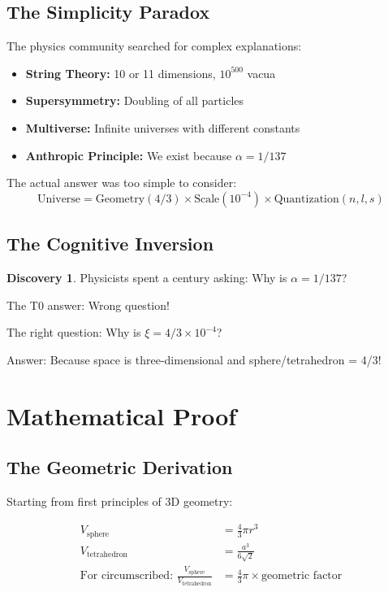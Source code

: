 \documentclass[12pt,a4paper]{article}
\theoremstyle{definition}
\newtheorem{discovery}{Discovery}[section]
\begin{document}
	\subsection{The Simplicity Paradox}
	
	The physics community searched for complex explanations:
	
	\begin{itemize}
		\item \textbf{String Theory:} 10 or 11 dimensions, $10^{500}$ vacua
		\item \textbf{Supersymmetry:} Doubling of all particles
		\item \textbf{Multiverse:} Infinite universes with different constants
		\item \textbf{Anthropic Principle:} We exist because $\alpha = 1/137$
	\end{itemize}
	
	The actual answer was too simple to consider:
	\begin{equation}
		\boxed{\text{Universe} = \text{Geometry}(4/3) \times \text{Scale}(10^{-4}) \times \text{Quantization}(n,l,s)}
	\end{equation}
	
	\subsection{The Cognitive Inversion}
	
	\begin{discovery}
		Physicists spent a century asking: Why is $\alpha = 1/137$?
		
		The T0 answer: Wrong question!
		
		The right question: Why is $\xi = 4/3 \times 10^{-4}$?
		
		Answer: Because space is three-dimensional and sphere/tetrahedron = 4/3!
	\end{discovery}
	
	\section{Mathematical Proof}
	
	\subsection{The Geometric Derivation}
	
	Starting from first principles of 3D geometry:
	
	\begin{align}
		V_{\text{sphere}} &= \frac{4}{3}\pi r^3\\
		V_{\text{tetrahedron}} &= \frac{a^3}{6\sqrt{2}}\\
		\text{For circumscribed: } \frac{V_{\text{sphere}}}{V_{\text{tetrahedron}}} &= \frac{4}{3}\pi \times \text{geometric factor}
	\end{align}
	
\end{document}
